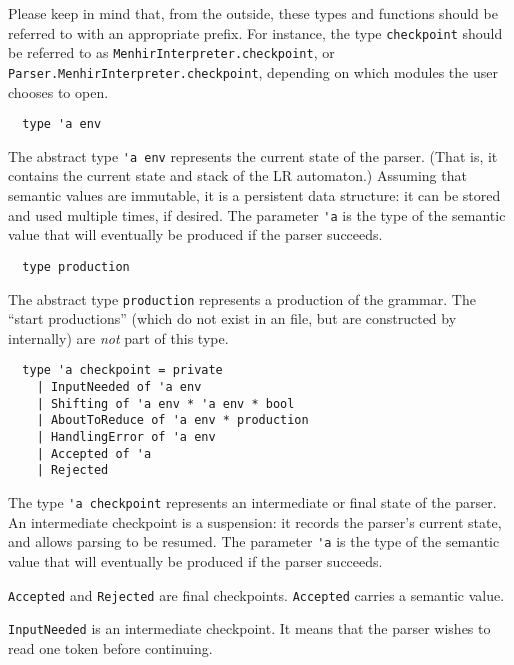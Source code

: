 \documentclass[onecolumn,11pt,nocopyrightspace,preprint]{sigplanconf}
\begin{document}
Please keep in mind that, from the outside, these types and functions should be referred
to with an appropriate prefix. For instance, the type \verb+checkpoint+ should be referred
to as \verb+MenhirInterpreter.checkpoint+, or
\verb+Parser.MenhirInterpreter.checkpoint+, depending on which modules the user
chooses to open.




\begin{verbatim}
  type 'a env
\end{verbatim}

The abstract type \verb+'a env+ represents the current state of the
parser. (That is, it contains the current state and stack of the LR
automaton.) Assuming that semantic values are immutable, it is a persistent
data structure: it can be stored and used multiple times, if desired.
The parameter \verb+'a+ is the type of the semantic value that will
eventually be produced if the parser succeeds.


\begin{verbatim}
  type production
\end{verbatim}

The abstract type \verb+production+ represents a production of the grammar.
%
The ``start productions'' (which do not exist in an \mly file, but are
constructed by \menhir internally) are \emph{not} part of this type.


\begin{verbatim}
  type 'a checkpoint = private
    | InputNeeded of 'a env
    | Shifting of 'a env * 'a env * bool
    | AboutToReduce of 'a env * production
    | HandlingError of 'a env
    | Accepted of 'a
    | Rejected
\end{verbatim}

The type \verb+'a checkpoint+ represents an intermediate or
final state of the parser. An intermediate checkpoint is a suspension: it records
the parser's current state, and allows parsing to be resumed. The parameter
\verb+'a+ is the type of the semantic value that will eventually be produced
if the parser succeeds.

\verb+Accepted+ and \verb+Rejected+ are final checkpoints. \verb+Accepted+ carries
a semantic value.

\verb+InputNeeded+ is an intermediate checkpoint. It means that the parser wishes
to read one token before continuing.
\end{document}
